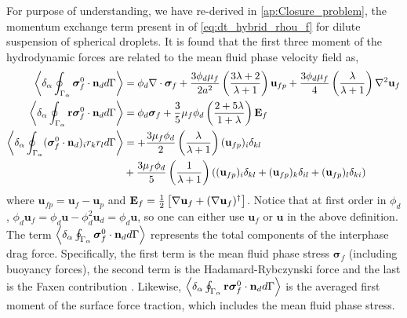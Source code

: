 For purpose of understanding, we have re-derived in \ref{ap:Closure_problem}, the momentum exchange term present in of \ref{eq:dt_hybrid_rhou_f} for dilute suspension of spherical droplets. 
It is found that the first three moment of the hydrodynamic forces are related to the mean fluid phase velocity field as, 
\begin{align}
    \label{eq:zeroth_mom}
    \left<\delta_\alpha \oint_{\Gamma_{\alpha}} \bm{\sigma}_f^0\cdot \textbf{n}_d d\Gamma\right> &= 
    \phi_d \mathbf{\nabla}\cdot\bm\sigma_f
    + \frac{3\phi_d\mu_f}{2 a^2} 
    \left(\frac{3\lambda+2}{\lambda+1}\right) \textbf{u}_{f p} 
    + \frac{3\phi_d\mu_f}{4} \left(\frac{\lambda}{\lambda+1}\right)\mathbf{\nabla}^2\textbf{u}_f\\
    \label{eq:first_mom}
    \left<\delta_\alpha \oint_{\Gamma_{\alpha}} \textbf{r}\bm{\sigma}_f^0 \cdot \textbf{n}_d d\Gamma\right> 
    &= 
    \phi_d \bm\sigma_f + 
    \frac{3}{5}\mu_f \phi_d \left(\frac{2+5\lambda}{1+\lambda}\right)
    \textbf{E}_f
    \\
    \label{eq:second_mom}
        \left<\delta_\alpha \oint_{\Gamma_{\alpha}} (\bm{\sigma}_f^0 \cdot \textbf{n}_d)_ir_kr_l d\Gamma\right> &=
        + \frac{3\mu_f\phi_d}{2}\left(\frac{\lambda}{\lambda+1}\right)(\textbf{u}_{fp})_i\delta_{kl}\\
        &+ \frac{3\mu_f\phi_d}{5}\left(\frac{1}{\lambda+1}\right)((\textbf{u}_{fp})_i\delta_{kl}+ (\textbf{u}_{fp})_k\delta_{il}+(\textbf{u}_{fp})_l\delta_{ki})\nonumber
\end{align}
where $\textbf{u}_{fp} = \textbf{u}_f - \textbf{u}_p$ and $\textbf{E}_f = \frac{1}{2}\left[\mathbf{\nabla} \textbf{u}_f + (\mathbf{\nabla} \textbf{u}_f)^\dagger\right]$. 
Notice that at first order in $\phi_d$, $\phi_d\textbf{u}_f =\phi_d\textbf{u} - \phi_d^2 \textbf{u}_d = \phi_d\textbf{u}$, so one can either use $\textbf{u}_f$ or $\textbf{u}$ in the above definition. 
The term $\left<\delta_\alpha \oint_{\Gamma_{\alpha}} \bm{\sigma}_f^0 \cdot \textbf{n}_d d\Gamma\right>$ represents the total components of the interphase drag force.
Specifically, the first term is the mean fluid phase stress $\bm\sigma_f$ (including buoyancy forces), the second term is the Hadamard-Rybczynski force and the last is the Faxen contribution \citep{kim2013microhydrodynamics}. 
Likewise, $\left<\delta_\alpha \oint_{\Gamma_{\alpha}} \textbf{r}\bm{\sigma}_f^0 \cdot \textbf{n}_d d\Gamma\right>$ is the averaged first moment of the surface force traction, which includes the mean fluid phase stress. 
